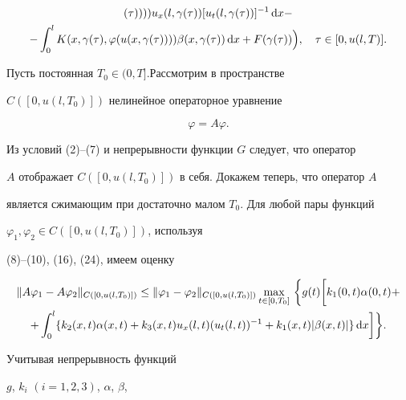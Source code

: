 \begin{pf}
\begin{multline}
(\tau ))))


u_x(l,\gamma (\tau ))[u_t(l,\gamma (\tau ))]^{-1}\d x-\\


-\int_0^l K(x,\gamma (\tau ),\varphi


(u(x,\gamma (\tau ))))\beta (x,\gamma (\tau ))\d


x+F(\gamma (\tau ))\Big),\q \tau \in [0,u(l,T)].




\end{multline}


Пусть постоянная $T_0\in ( 0,T]$.Рассмотрим в пространстве


$C([0,u(l,T_0)])$ нелинейное операторное уравнение


\begin{equation}


\varphi =A\varphi.




\end{equation}


Из условий (2)--(7) и непрерывности функции $G$ следует, что оператор


$A$ отображает $C([0,u(l,T_0)])$ в себя. Докажем теперь, что оператор $A$


является сжимающим при достаточно малом $T_0$. Для любой пары функций


$\varphi_1,\varphi_2\in C([0,u(l,T_0)])$, используя


(8)--(10), (16), (24), имеем оценку


\begin{multline}


\| A\varphi_1-A\varphi_2\|_{C([0,u(l,T_0)])}\leq


\| \varphi_1-\varphi_2\|_{C([0,u(l,T_0)])}


\max_{t\in [ 0,T_0]}\,\bigg\{ g(t)\bigg[ k_1(0,t)\alpha


(0,t)+\\


+\int_0^l \{k_2(x,t)\alpha


(x,t)+k_3(x,t)u_x(l,t)(u_t(l,t))^{-1}


+k_1(x,t)| \beta (x,t)|\}\d x\bigg]\bigg\}.




\end{multline}


Учитывая непрерывность функций


$g$, $k_i$ $(i=1,2,3)$, $\alpha$, $\beta$,



\end{pf}
